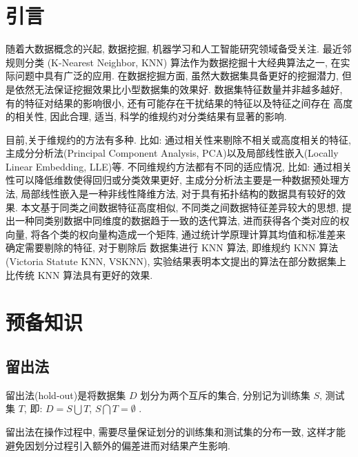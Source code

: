 \documentclass[11pt]{article}
\numberwithin{equation}{section}
\begin{document}
 
\section{引言} \label{引言}
随着大数据概念的兴起, 数据挖掘\cite{毛国君}, 机器学习\cite{陈康}和人工智能\cite{孙伟平}研究领域备受关注.
最近邻规则分类 (K-Nearest Neighbor, KNN) 算法\cite{knn}作为数据挖掘十大经典算法之一, 
在实际问题中具有广泛的应用.
在数据挖掘方面, 虽然大数据集具备更好的挖掘潜力, 但是依然无法保证挖掘效果比小型数据集的效果好.
数据集特征数量并非越多越好, 有的特征对结果的影响很小, 还有可能存在干扰结果的特征以及特征之间存在
高度的相关性, 因此合理, 适当, 科学的维规约\cite{许明旺}对分类结果有显著的影响. 

目前,关于维规约的方法有多种. 比如: 通过相关性来剔除不相关或高度相关的特征, 主成分分析法(Principal Component Analysis, PCA)\cite{pca}以及局部线性嵌入(Locally Linear Embedding, LLE)\cite{saul}等.
不同维规约方法都有不同的适应情况, 比如: 通过相关性可以降低维数使得回归或分类效果更好, 主成分分析法主要是一种数据预处理方法,
局部线性嵌入是一种非线性降维方法, 对于具有拓扑结构的数据具有较好的效果.
本文基于同类之间数据特征高度相似, 不同类之间数据特征差异较大的思想, 提出一种同类别数据中同维度的数据趋于一致的迭代算法, 进而获得各个类对应的权向量, 将各个类的权向量构造成一个矩阵, 通过统计学原理计算其均值和标准差来确定需要剔除的特征, 对于剔除后
数据集进行 KNN 算法, 即维规约 KNN 算法(Victoria Statute KNN, VSKNN), 实验结果表明本文提出的算法在部分数据集上比传统 KNN 算法具有更好的效果.



\section{预备知识}\label{预备知识}

\subsection{留出法}
留出法(hold-out)\cite{机器学习原理}是将数据集 $D$ 划分为两个互斥的集合, 分别记为训练集 $S$, 测试集 $T$, 即: $D = S\bigcup T$, $S\bigcap T = \emptyset$ .

留出法在操作过程中, 需要尽量保证划分的训练集和测试集的分布一致, 这样才能避免因划分过程引入额外的偏差进而对结果产生影响.
\end{document}
